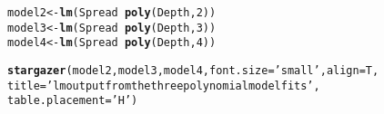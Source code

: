 \documentclass[12pt]{article}\usepackage[]{graphicx}\usepackage[]{color}
\makeatletter
\newcommand{\hlnum}[1]{\textcolor[rgb]{0.686,0.059,0.569}{#1}}%
\newcommand{\hlstr}[1]{\textcolor[rgb]{0.192,0.494,0.8}{#1}}%
\newcommand{\hlopt}[1]{\textcolor[rgb]{0,0,0}{#1}}%
\newcommand{\hlstd}[1]{\textcolor[rgb]{0.345,0.345,0.345}{#1}}%
\newcommand{\hlkwb}[1]{\textcolor[rgb]{0.69,0.353,0.396}{#1}}%
\newcommand{\hlkwc}[1]{\textcolor[rgb]{0.333,0.667,0.333}{#1}}%
\newcommand{\hlkwd}[1]{\textcolor[rgb]{0.737,0.353,0.396}{\textbf{#1}}}%
\newenvironment{kframe}{%
 \def\at@end@of@kframe{}%
 \ifinner\ifhmode%
  \def\at@end@of@kframe{\end{minipage}}%
  \begin{minipage}{\columnwidth}%
 \fi\fi%
 \def\FrameCommand##1{\hskip\@totalleftmargin \hskip-\fboxsep
 \colorbox{shadecolor}{##1}\hskip-\fboxsep
     \hskip-\linewidth \hskip-\@totalleftmargin \hskip\columnwidth}%
 \MakeFramed {\advance\hsize-\width
   \@totalleftmargin\z@ \linewidth\hsize
   \@setminipage}}%
 {\par\unskip\endMakeFramed%
 \at@end@of@kframe}
\makeatother
\begin{document}
\begin{kframe}
\begin{alltt}
\hlstd{model2} \hlkwb{<-} \hlkwd{lm}\hlstd{(Spread} \hlopt{~} \hlkwd{poly}\hlstd{(Depth,}\hlnum{2}\hlstd{))}
\hlstd{model3} \hlkwb{<-} \hlkwd{lm}\hlstd{(Spread} \hlopt{~} \hlkwd{poly}\hlstd{(Depth,}\hlnum{3}\hlstd{))}
\hlstd{model4} \hlkwb{<-} \hlkwd{lm}\hlstd{(Spread} \hlopt{~} \hlkwd{poly}\hlstd{(Depth,}\hlnum{4}\hlstd{))}

\hlkwd{stargazer}\hlstd{(model2, model3, model4,} \hlkwc{font.size}  \hlstd{=} \hlstr{'small'}\hlstd{,} \hlkwc{align} \hlstd{= T,}
          \hlkwc{title} \hlstd{=} \hlstr{'lm output from the three polynomial model fits'}\hlstd{,}
          \hlkwc{table.placement} \hlstd{=} \hlstr{'H'}\hlstd{)}
\end{alltt}
\end{kframe}
\end{document}
